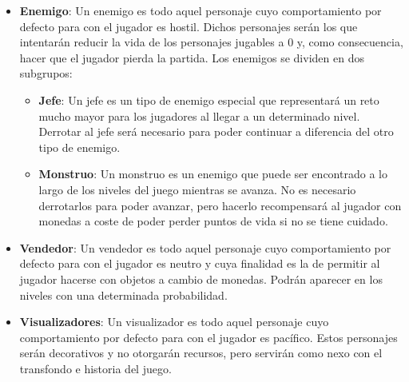 \begin{itemize}
    \item \textbf{Enemigo}: Un enemigo es todo aquel personaje cuyo
    comportamiento por defecto para con el jugador es hostil. Dichos personajes
    serán los que intentarán reducir la vida de los personajes jugables a $0$ y,
    como consecuencia, hacer que el jugador pierda la partida. Los enemigos se
    dividen en dos subgrupos:
    \begin{itemize}
        \item \textbf{Jefe}: Un jefe es un tipo de enemigo especial que
        representará un reto mucho mayor para los jugadores al llegar a un
        determinado nivel. Derrotar al jefe será necesario para poder continuar
        a diferencia del otro tipo de enemigo.
        \item \textbf{Monstruo}: Un monstruo es un enemigo que puede ser
        encontrado a lo largo de los niveles del juego mientras se avanza. No es
        necesario derrotarlos para poder avanzar, pero hacerlo recompensará al
        jugador con monedas a coste de poder perder puntos de vida si no se
        tiene cuidado.
    \end{itemize}
    \item \textbf{Vendedor}: Un vendedor es todo aquel personaje cuyo
    comportamiento por defecto para con el jugador es neutro y cuya finalidad es
    la de permitir al jugador hacerse con objetos a cambio de monedas. Podrán
    aparecer en los niveles con una determinada probabilidad.
    \item \textbf{Visualizadores}: Un visualizador es todo aquel personaje cuyo
    comportamiento por defecto para con el jugador es pacífico. Estos personajes
    serán decorativos y no otorgarán recursos, pero servirán como nexo con el
    transfondo e historia del juego.
\end{itemize}